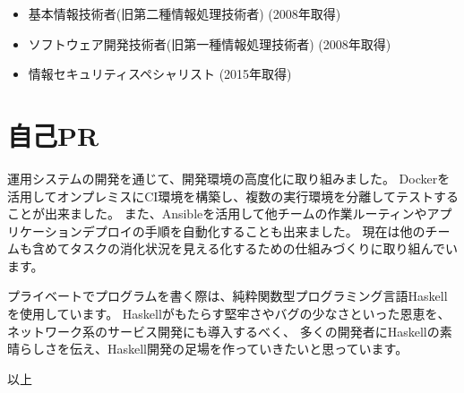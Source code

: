 \documentclass[9pt]{jsarticle}
\begin{document}
\begin{itemize}
  \item 基本情報技術者(旧第二種情報処理技術者) (2008年取得)
  \item ソフトウェア開発技術者(旧第一種情報処理技術者) (2008年取得)
  \item 情報セキュリティスペシャリスト (2015年取得)
\end{itemize}

\section{自己PR}

運用システムの開発を通じて、開発環境の高度化に取り組みました。
Dockerを活用してオンプレミスにCI環境を構築し、複数の実行環境を分離してテストすることが出来ました。
また、Ansibleを活用して他チームの作業ルーティンやアプリケーションデプロイの手順を自動化することも出来ました。
現在は他のチームも含めてタスクの消化状況を見える化するための仕組みづくりに取り組んでいます。

プライベートでプログラムを書く際は、純粋関数型プログラミング言語Haskellを使用しています。
Haskellがもたらす堅牢さやバグの少なさといった恩恵を、ネットワーク系のサービス開発にも導入するべく、
多くの開発者にHaskellの素晴らしさを伝え、Haskell開発の足場を作っていきたいと思っています。

\begin{flushright}
  以上
\end{flushright}
\end{document}
